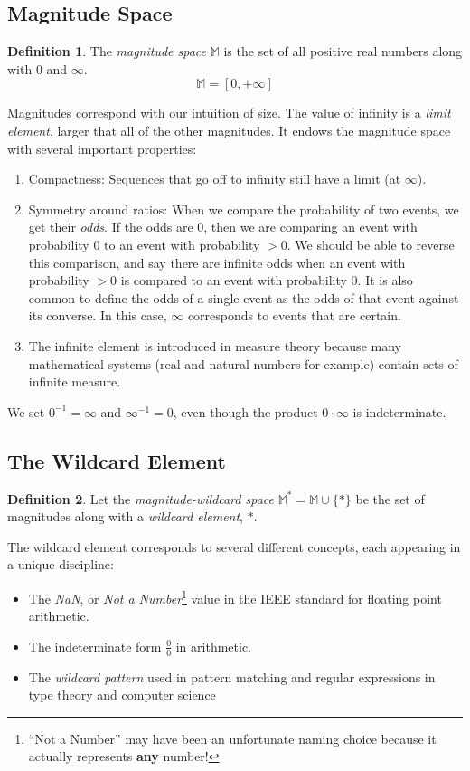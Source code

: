 \documentclass[twoside]{article}
\newcommand{\quotes}[1]{``#1''}
\theoremstyle{plain}%
\theoremstyle{definition}
\newtheorem{definition}{Definition}[section]
\theoremstyle{remark}
\begin{document}
\subsection{Magnitude Space}

\begin{definition}
The \textit{magnitude space} \(\mathbb{M}\) is the set of all positive real numbers along with \(0\) and \(\infty\).
\[\mathbb{M} = [0, +\infty]\]
\end{definition}

Magnitudes correspond with our intuition of size. The value of infinity is a \textit{limit element}, larger that all of the other magnitudes. It endows the magnitude space with several important properties:

\begin{enumerate}
\item Compactness: Sequences that go off to infinity still have a limit (at \(\infty\)).
\item Symmetry around ratios: When we compare the probability of two events, we get their \textit{odds}. If the odds are 0, then we are comparing an event with probability 0 to an event with probability \(>0\). We should be able to reverse this comparison, and say there are infinite odds when an event with probability \(>0\) is compared to an event with probability 0. It is also common to define the odds of a single event as the odds of that event against its converse. In this case, \(\infty\) corresponds to events that are certain.
\item The infinite element is introduced in measure theory because many mathematical systems (real and natural numbers for example) contain sets of infinite measure.
\end{enumerate}

We set \(0^{-1} = \infty\) and \(\infty^{-1} = 0\), even though the product \(0 \cdot \infty\) is indeterminate.

\subsection{The Wildcard Element}

\begin{definition}
Let the \textit{magnitude-wildcard space} \(\mathbb{M}^*= \mathbb{M} \cup \{\ast\}\) be the set of magnitudes along with a \textit{wildcard element}, \(\ast\).
\end{definition}

The wildcard element corresponds to several different concepts, each appearing in a unique discipline:
\begin{itemize}
  \item The \textit{NaN}, or \textit{Not a Number}\footnote{\quotes{Not a Number} may have been an unfortunate naming choice because it actually represents \textbf{any} number!} value in the IEEE standard for floating point arithmetic\cite{ieee}.
  \item The indeterminate form \(\frac{0}{0}\) in arithmetic.
  \item The \textit{wildcard pattern} used in pattern matching and regular expressions in type theory and computer science
\end{itemize}
\end{document}
